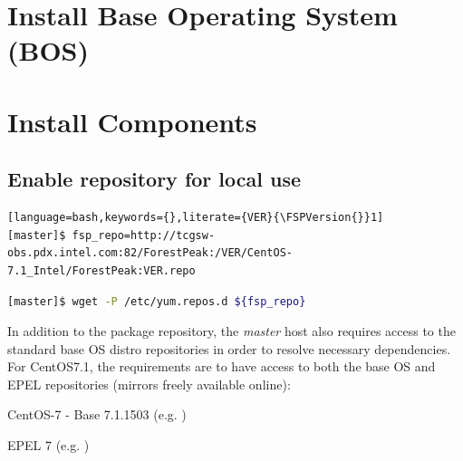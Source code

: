 \documentclass[letterpaper]{article}
\newcommand{\baseOS}{CentOS7.1}
\newcommand{\FSPVersion}{15.31}
\begin{document}






\section{Install Base Operating System (BOS)}



\section{Install \FSP{} Components} \label{sec:basic_install}


\subsection{Enable \FSP{} repository for local use} \label{sec:enable_repo}


\begin{lstlisting}[language=bash,keywords={},literate={VER}{\FSPVersion{}}1]
[master]$ fsp_repo=http://tcgsw-obs.pdx.intel.com:82/ForestPeak:/VER/CentOS-7.1_Intel/ForestPeak:VER.repo
\end{lstlisting}

\begin{lstlisting}[language=bash,keywords={}]
[master]$ wget -P /etc/yum.repos.d ${fsp_repo}
\end{lstlisting}


In addition to the \FSP{} package repository, the {\em master} host also
requires access to the standard base OS distro repositories in order to resolve
necessary dependencies. For \baseOS{}, the requirements are to have access to
both the base OS and EPEL repositories (mirrors freely available online):

\begin{itemize*}
\item CentOS-7 - Base 7.1.1503
  (e.g. \href{http://mirror.centos.org/centos/7.1.1503/os/x86\_64}
             {\color{blue}{http://mirror.centos.org/centos/7.1.1503/os/x86\_64}} )
\item EPEL 7 (e.g. \href{http://download.fedoraproject.org/pub/epel/7/x86\_64}
                        {\color{blue}{http://download.fedoraproject.org/pub/epel/7/x86\_64}} )
\end{itemize*}
\end{document}
